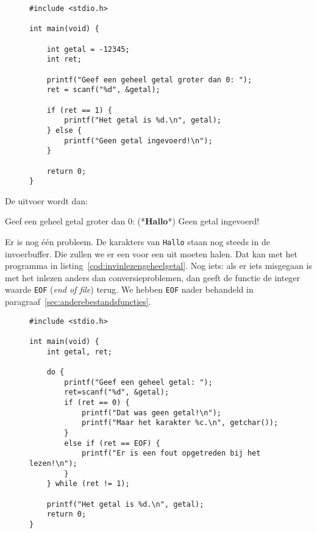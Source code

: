 \begin{figure}[!ht]
\begin{lstlisting}[caption=Inlezen van een getal groter dan 0.,label=cod:invgetalgroterdan]
#include <stdio.h>

int main(void) {

    int getal = -12345;
    int ret;

    printf("Geef een geheel getal groter dan 0: ");
    ret = scanf("%d", &getal);

    if (ret == 1) {
        printf("Het getal is %d.\n", getal);
    } else {
        printf("Geen getal ingevoerd!\n");
    }

    return 0;
}
\end{lstlisting}
\end{figure}

De uitvoer wordt dan:

\begin{dosbox}[title=Uitvoer van het programma.]
Geef een geheel getal groter dan 0: (*\textbf{Hallo}*)
Geen getal ingevoerd!
\end{dosbox}

Er is nog \'e\'en probleem. De karakters van \texttt{Hallo} staan nog steeds in de invoerbuffer. Die zullen we er een voor een uit moeten halen. Dat kan met het programma in listing~\ref{cod:invinlezengeheelgetal}. Nog iets: als er iets misgegaan is met het inlezen anders dan conversieproblemen, dan geeft de functie de integer waarde \texttt{EOF} (\textsl{end of file}) terug. We hebben \texttt{EOF} nader behandeld in paragraaf~\ref{sec:anderebestandsfuncties}.

\begin{figure}[!ht]
\begin{lstlisting}[caption=Inlezen van een geheel getal.,label=cod:invinlezengeheelgetal]
#include <stdio.h>

int main(void) {
    int getal, ret;
    
    do {
        printf("Geef een geheel getal: ");
        ret=scanf("%d", &getal);
        if (ret == 0) {
            printf("Dat was geen getal!\n");
            printf("Maar het karakter %c.\n", getchar());
        }
        else if (ret == EOF) {
            printf("Er is een fout opgetreden bij het lezen!\n");
        }
    } while (ret != 1);

    printf("Het getal is %d.\n", getal);
    return 0;
}
\end{lstlisting}
\end{figure}


